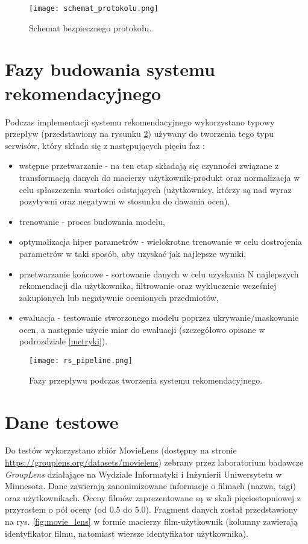 \begin{figure}[h]
    \texttt{[image: schemat\_protokolu.png]}
    \caption{Schemat bezpiecznego protokołu.}
    \label{fig:schemat}
\end{figure}

\section{Fazy budowania systemu rekomendacyjnego}

Podczas implementacji systemu rekomendacyjnego wykorzystano typowy przepływ (przedstawiony na rysunku \ref{fig:rs_pipeline}) używany do tworzenia tego typu serwisów, który składa się z następujących pięciu faz \cite{rs_in_real}:
\begin{itemize}
    \item wstępne przetwarzanie - na ten etap składają się czynności związane z transformacją danych do macierzy użytkownik-produkt oraz normalizacja w celu spłaszczenia wartości odstających (użytkownicy, którzy są nad wyraz pozytywni oraz negatywni w stosunku do dawania ocen),
    \item trenowanie - proces budowania modelu,
    \item optymalizacja hiper parametrów - wielokrotne trenowanie w celu dostrojenia parametrów w taki sposób, aby uzyskać jak najlepsze wyniki,
    \item przetwarzanie końcowe - sortowanie danych w celu uzyskania N najlepszych rekomendacji dla użytkownika, filtrowanie oraz wykluczenie wcześniej zakupionych lub negatywnie ocenionych przedmiotów,
    \item ewaluacja - testowanie stworzonego modelu poprzez ukrywanie/maskowanie ocen, a następnie użycie miar do ewaluacji (szczegółowo opisane w podrozdziale \ref{metryki}).
\end{itemize}{}

\begin{figure}[h]
    \texttt{[image: rs\_pipeline.png]}
    \caption{Fazy przepływu podczas tworzenia systemu rekomendacyjnego.}
    \label{fig:rs_pipeline}
\end{figure}

\section{Dane testowe}\label{dane}

Do testów wykorzystano zbiór MovieLens (dostępny na stronie \url{https://grouplens.org/datasets/movielens}) zebrany przez laboratorium badawcze \textit{GroupLens} działające na Wydziale Informatyki i Inżynierii Uniwersytetu w Minnesota. Dane zawierają zanonimizowane informacje o filmach (nazwa, tagi) oraz użytkownikach. Oceny filmów zaprezentowane są w skali pięciostopniowej z przyrostem o pół oceny (od 0.5 do 5.0). Fragment danych został przedstawiony na rys. \ref{fig:movie_lens} w formie macierzy film-użytkownik (kolumny zawierają identyfikator filmu, natomiast wiersze identyfikator użytkownika).

